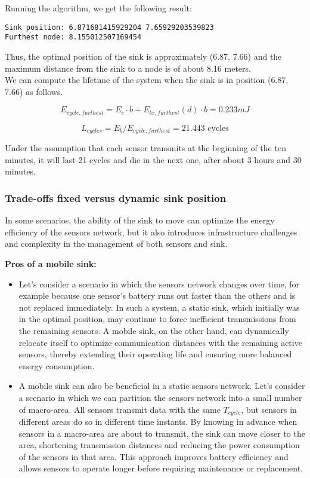 Running the algorithm, we get the following result:
\begin{verbatim}
Sink position: 6.871681415929204 7.65929203539823
Furthest node: 8.155012507169454
\end{verbatim}

Thus, the optimal position of the sink is approximately (6.87, 7.66) and the maximum distance from the sink to a node is of about 8.16 meters.\\
We can compute the lifetime of the system when the sink is in position (6.87, 7.66) as follows.

\[
E_{cycle, furthest} = E_c \cdot b + E_{tx, furthest}(d) \cdot b = 0.233 mJ
\]

\[
L_{cycles} = E_b / E_{cycle, furthest} = 21.443 \text{ cycles}
\]

Under the assumption that each sensor transmits at the beginning of the ten minutes, it will last 21 cycles and die in the next one, after about 3 hours and 30 minutes.

\subsubsection{Trade-offs fixed versus dynamic sink position}

In some scenarios, the ability of the sink to move can optimize the energy efficiency of the sensors network, but it also introduces infrastructure challenges and complexity in the management of both sensors and sink.

\textbf{Pros of a mobile sink:} 
\begin{itemize}

\item Let's consider a scenario in which the sensors network changes over time, for example because one sensor's battery runs out faster than the others and is not replaced immediately. In such a system, a static sink, which initially was in the optimal position, may continue to force inefficient transmissions from the remaining sensors. A mobile sink, on the other hand, can dynamically relocate itself to optimize communication distances with the remaining active sensors, thereby extending their operating life and ensuring more balanced energy consumption.

\item A mobile sink can also be beneficial in a static sensors network. Let's consider a scenario in which we can partition the sensors network into a small number of macro-area. All sensors transmit data with the same $T_{cycle}$, but sensors in different areas do so in different time instants. By knowing in advance when sensors in a macro-area are about to transmit, the sink can move closer to the area, shortening transmission distances and reducing the power consumption of the sensors in that area. This approach improves battery efficiency and allows sensors to operate longer before requiring maintenance or replacement.
\end{itemize}

